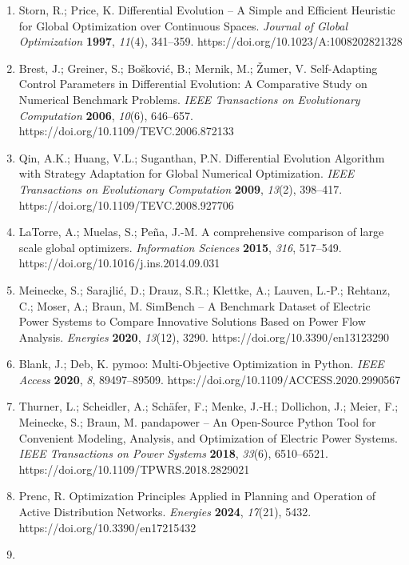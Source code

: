 \documentclass[
  10pt,
  a4paper,
]{article}
\providecommand{\tightlist}{%
  \setlength{\itemsep}{0pt}\setlength{\parskip}{0pt}}
\begin{document}
\begin{enumerate}
\def\labelenumi{\arabic{enumi}.}
\tightlist
\item
  Storn, R.; Price, K. Differential Evolution -- A Simple and Efficient
  Heuristic for Global Optimization over Continuous Spaces.
  \emph{Journal of Global Optimization} \textbf{1997}, \emph{11}(4),
  341--359. https://doi.org/10.1023/A:1008202821328
\item
  Brest, J.; Greiner, S.; Bošković, B.; Mernik, M.; Žumer, V.
  Self-Adapting Control Parameters in Differential Evolution: A
  Comparative Study on Numerical Benchmark Problems. \emph{IEEE
  Transactions on Evolutionary Computation} \textbf{2006}, \emph{10}(6),
  646--657. https://doi.org/10.1109/TEVC.2006.872133
\item
  Qin, A.K.; Huang, V.L.; Suganthan, P.N. Differential Evolution
  Algorithm with Strategy Adaptation for Global Numerical Optimization.
  \emph{IEEE Transactions on Evolutionary Computation} \textbf{2009},
  \emph{13}(2), 398--417. https://doi.org/10.1109/TEVC.2008.927706
\item
  LaTorre, A.; Muelas, S.; Peña, J.-M. A comprehensive comparison of
  large scale global optimizers. \emph{Information Sciences}
  \textbf{2015}, \emph{316}, 517--549.
  https://doi.org/10.1016/j.ins.2014.09.031
\item
  Meinecke, S.; Sarajlić, D.; Drauz, S.R.; Klettke, A.; Lauven, L.-P.;
  Rehtanz, C.; Moser, A.; Braun, M. SimBench -- A Benchmark Dataset of
  Electric Power Systems to Compare Innovative Solutions Based on Power
  Flow Analysis. \emph{Energies} \textbf{2020}, \emph{13}(12), 3290.
  https://doi.org/10.3390/en13123290
\item
  Blank, J.; Deb, K. pymoo: Multi-Objective Optimization in Python.
  \emph{IEEE Access} \textbf{2020}, \emph{8}, 89497--89509.
  https://doi.org/10.1109/ACCESS.2020.2990567
\item
  Thurner, L.; Scheidler, A.; Schäfer, F.; Menke, J.-H.; Dollichon, J.;
  Meier, F.; Meinecke, S.; Braun, M. pandapower -- An Open-Source Python
  Tool for Convenient Modeling, Analysis, and Optimization of Electric
  Power Systems. \emph{IEEE Transactions on Power Systems}
  \textbf{2018}, \emph{33}(6), 6510--6521.
  https://doi.org/10.1109/TPWRS.2018.2829021
\item
  Prenc, R. Optimization Principles Applied in Planning and Operation of
  Active Distribution Networks. \emph{Energies} \textbf{2024},
  \emph{17}(21), 5432. https://doi.org/10.3390/en17215432
\item

\end{enumerate}
\end{document}
